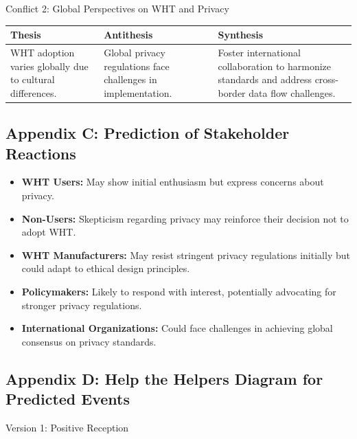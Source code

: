 \documentclass[11pt]{article}
\begin{document}
\noindent Conflict 2: Global Perspectives on WHT and Privacy

\begin{center}\small
\begin{tabularx}{\linewidth}{@{}>{\raggedright\arraybackslash}X>{\raggedright\arraybackslash}X>{\raggedright\arraybackslash}X@{}}
\toprule
Thesis & Antithesis & Synthesis \\
\midrule
WHT adoption varies globally due to cultural differences. & Global privacy regulations face challenges in implementation. & Foster international collaboration to harmonize standards and address cross-border data flow challenges. \\
\bottomrule
\end{tabularx}
\end{center}

\subsection*{Appendix C: Prediction of Stakeholder Reactions}

\begin{itemize}[label={},leftmargin=2em,itemsep=1pt,parsep=0pt]
  \item \textbf{WHT Users:} May show initial enthusiasm but express concerns about privacy.
  \item \textbf{Non-Users:} Skepticism regarding privacy may reinforce their decision not to adopt WHT.
  \item \textbf{WHT Manufacturers:} May resist stringent privacy regulations initially but could adapt to ethical design principles.
  \item \textbf{Policymakers:} Likely to respond with interest, potentially advocating for stronger privacy regulations.
  \item \textbf{International Organizations:} Could face challenges in achieving global consensus on privacy standards.
\end{itemize}

\subsection*{Appendix D: Help the Helpers Diagram for Predicted Events}

\noindent Version 1: Positive Reception
\end{document}
